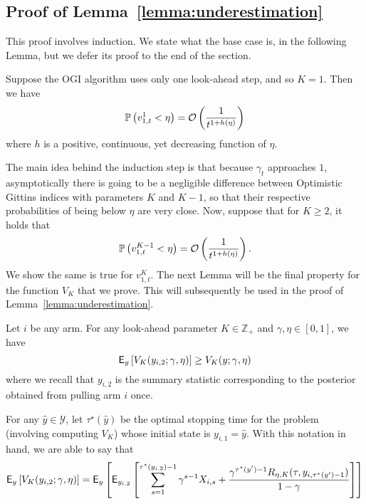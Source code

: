 \subsection{Proof of Lemma~\ref{lemma:underestimation}} \label{proof:underestimation_proof}
\begin{myproof}[Proof.]
	This proof involves induction. We state what the base case is, in the following Lemma, but we defer its proof to the end of the section.
	\begin{lemma} \label{lemma:underestimation_base_case}
		Suppose the OGI algorithm uses only one look-ahead step, and so $K = 1$. Then we have
		\[
		\P{v^1_{1,t} < \eta} = \mathcal{O}\left(\frac{1}{t^{1 + h(\eta)}}\right)
		\]
		where $h$ is a positive, continuous, yet decreasing function of $\eta$.
	\end{lemma}
	The main idea behind the induction step is that because $\gamma_t$ approaches $1$, asymptotically there is going to be a negligible difference between Optimistic Gittins indices with parameters $K$ and $K-1$, so that their respective probabilities of being below $\eta$ are very close. Now, suppose that for $K \ge 2$, it holds that
	\[
	\P{v^{K-1}_{1,t} < \eta} = \mathcal{O}\left(\frac{1}{t^{1 + h(\eta)}}\right).
	\]
	We show the same is true for $v^{K}_{1,t}$. 
	The next Lemma will be the final property for the function $V_K$ that we prove. This will subsequently be used in the proof of Lemma~\ref{lemma:underestimation}.
	\begin{lemma} \label{lemma:vk_bound}
		Let $i$ be any arm. For any look-ahead parameter $K \in \mathbb{Z}_+$ and $\gamma, \eta \in [0,1]$, we have
		\begin{equation*}
		\E_y\left[V_K(y_{i,2}; \gamma, \eta) \right] \ge V_K(y; \gamma, \eta)
		\end{equation*}
		where we recall that $y_{i,2}$ is the summary statistic corresponding to the posterior obtained from pulling arm $i$ once.
	\end{lemma}
	\begin{myproof}[Proof.]
		For any $\hat y \in \mathcal{Y}$, let $\tau^\star(\hat y)$ be the optimal stopping time for the problem (involving computing $V_K$) whose initial state is $y_{i,1} = \hat y$. With this notation in hand, we are able to say that
		\begin{align}
		\E_y \left[V_K(y_{i,2}; \gamma, \eta) \right] & = \E_y\left[\E_{y_{i,2}}\left[\sum_{s=1}^{\tau^\star(y_{i,2})-1} \gamma^{s-1} X_{i,s} + \frac{\gamma^{\tau^\star(y')-1} R_{\eta, K}(\tau, y_{i,\tau^\star(y')-1})}{1-\gamma} \right]\right]\nonumber \\

\end{align}
\end{myproof}
\end{myproof}
